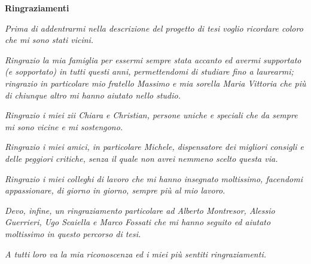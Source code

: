 \begin{center}
  {\bf \Huge Ringraziamenti}
\end{center}

\vspace{4cm}

\emph{
Prima di addentrarmi nella descrizione del progetto di tesi voglio ricordare coloro che mi sono stati vicini.
}

\emph{
Ringrazio la mia famiglia per essermi sempre stata accanto ed avermi supportato (e sopportato) in tutti questi anni, permettendomi di studiare fino a laurearmi; ringrazio in particolare mio fratello Massimo e mia sorella Maria Vittoria che più di chiunque altro mi hanno aiutato nello studio.
}

\emph{
Ringrazio i miei zii Chiara e Christian, persone uniche e speciali che da sempre mi sono vicine e mi sostengono. 
}

\emph{
Ringrazio i miei amici, in particolare Michele, dispensatore dei migliori consigli e delle peggiori critiche, senza il quale non avrei nemmeno scelto questa via.
}

\emph{
Ringrazio i miei colleghi di lavoro che mi hanno insegnato moltissimo, facendomi appassionare, di giorno in giorno, sempre più al mio lavoro. 
}

\emph{
Devo, infine, un ringraziamento particolare ad Alberto Montresor, Alessio Guerrieri, Ugo Scaiella e Marco Fossati che mi hanno seguito ed aiutato moltissimo in questo percorso di tesi.
}

\emph{
A tutti loro va la mia riconoscenza ed i miei più sentiti ringraziamenti.
}
